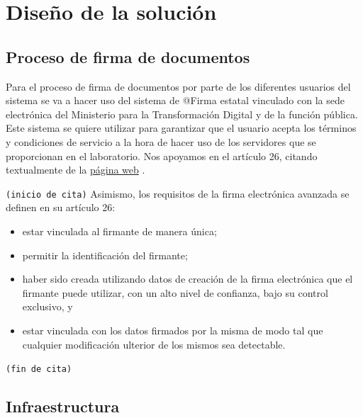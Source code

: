 \newpage


\section{Diseño de la solución}

\subsection{Proceso de firma de documentos}

Para el proceso de firma de documentos por parte de los diferentes usuarios del sistema se va a hacer uso del sistema de @Firma estatal vinculado con la sede electrónica del Ministerio para la Transformación Digital y de la función pública. \cite{PAE} 
Este sistema se quiere utilizar para garantizar que el usuario acepta los términos y condiciones de servicio a la hora de hacer uso de los servidores que se proporcionan en el laboratorio. Nos apoyamos en el artículo 26, citando textualmente de la \href{https://sedediatid.digital.gob.es/es-es/firmaelectronica/Paginas/firma.aspx}{página web} \cite{sede_electronica_firma_digital, firma_electronica_ciudadanos}. 

\texttt{(inicio de cita)}
Asimismo, los requisitos de la firma electrónica avanzada se definen en su artículo 26:
\begin{itemize}
  \item estar vinculada al firmante de manera única;
  \item permitir la identificación del firmante;
  \item haber sido creada utilizando datos de creación de la firma electrónica que el firmante puede utilizar, con un alto nivel de confianza, bajo su control exclusivo, y
  \item estar vinculada con los datos firmados por la misma de modo tal que cualquier modificación ulterior de los mismos sea detectable. 
\end{itemize}
\texttt{(fin de cita)}

\subsection{Infraestructura}

